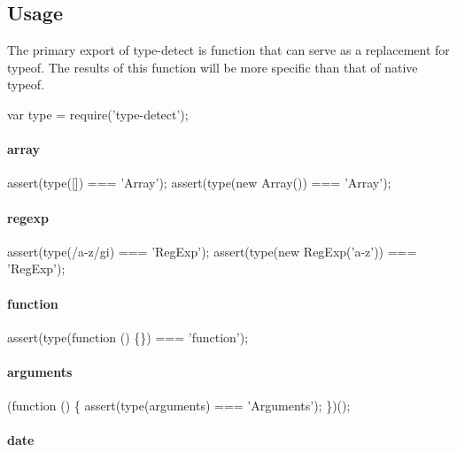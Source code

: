 \subsection*{Usage}

The primary export of {\ttfamily type-\/detect} is function that can serve as a replacement for {\ttfamily typeof}. The results of this function will be more specific than that of native {\ttfamily typeof}.


\begin{DoxyCode}
var type = require('type-detect');
\end{DoxyCode}


\paragraph*{array}


\begin{DoxyCode}
assert(type([]) === 'Array');
assert(type(new Array()) === 'Array');
\end{DoxyCode}


\paragraph*{regexp}


\begin{DoxyCode}
assert(type(/a-z/gi) === 'RegExp');
assert(type(new RegExp('a-z')) === 'RegExp');
\end{DoxyCode}


\paragraph*{function}


\begin{DoxyCode}
assert(type(function () \{\}) === 'function');
\end{DoxyCode}


\paragraph*{arguments}


\begin{DoxyCode}
(function () \{
  assert(type(arguments) === 'Arguments');
\})();
\end{DoxyCode}


\paragraph*{date}



